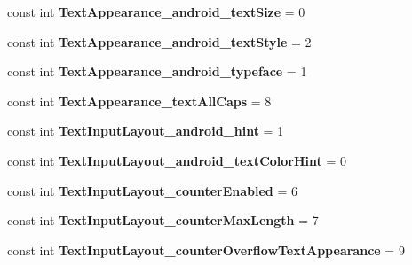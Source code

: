 \begin{DoxyCompactItemize}
\item 
\mbox{\label{classXaria_1_1Resource_1_1Styleable_ab03777f2846414484298e340e24dfe12}} 
const int {\bfseries Text\+Appearance\+\_\+android\+\_\+text\+Size} = 0
\item 
\mbox{\label{classXaria_1_1Resource_1_1Styleable_aa78833da8d649b39d4ed769b01ec336c}} 
const int {\bfseries Text\+Appearance\+\_\+android\+\_\+text\+Style} = 2
\item 
\mbox{\label{classXaria_1_1Resource_1_1Styleable_a3043058cad6798e252490e520e65a2c9}} 
const int {\bfseries Text\+Appearance\+\_\+android\+\_\+typeface} = 1
\item 
\mbox{\label{classXaria_1_1Resource_1_1Styleable_a4751f901ba97c7e05ab180acaeb3703a}} 
const int {\bfseries Text\+Appearance\+\_\+text\+All\+Caps} = 8
\item 
\mbox{\label{classXaria_1_1Resource_1_1Styleable_a25f3a70c9f68d8f15fa0243fc8e138e3}} 
const int {\bfseries Text\+Input\+Layout\+\_\+android\+\_\+hint} = 1
\item 
\mbox{\label{classXaria_1_1Resource_1_1Styleable_a347ab59b2234a3db1f346958b5cf5faa}} 
const int {\bfseries Text\+Input\+Layout\+\_\+android\+\_\+text\+Color\+Hint} = 0
\item 
\mbox{\label{classXaria_1_1Resource_1_1Styleable_ac90b3d2bb9fc8663f042c847765e9951}} 
const int {\bfseries Text\+Input\+Layout\+\_\+counter\+Enabled} = 6
\item 
\mbox{\label{classXaria_1_1Resource_1_1Styleable_aaf2555b4f455d10b37bb3c7ddb9135c5}} 
const int {\bfseries Text\+Input\+Layout\+\_\+counter\+Max\+Length} = 7
\item 
\mbox{\label{classXaria_1_1Resource_1_1Styleable_abcc593702dd6bfbe055f3d94079a3201}} 
const int {\bfseries Text\+Input\+Layout\+\_\+counter\+Overflow\+Text\+Appearance} = 9

\end{DoxyCompactItemize}

